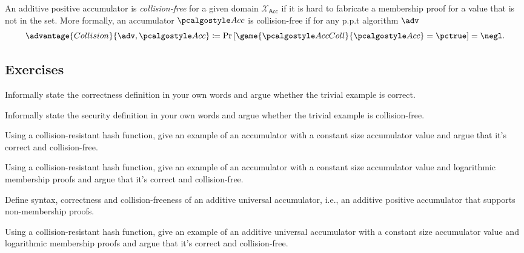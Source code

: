\begin{definition}
    An additive positive accumulator is \emph{collision-free} for a given domain $\mathcal{X}_\mathsf{Acc}$ if it is hard to fabricate a membership proof for a value that is not in the set.
    More formally, an accumulator $\algo{Acc}$ is collision-free if for any p.p.t algorithm $\adv$
    \[
      \advantage{Collision}{\adv, \algo{Acc}} \defeq \pr{\game{\algo{AccColl}}{\algo{Acc}} = \pctrue} = \negl.
    \]
\end{definition}

\subsection{Exercises}

\begin{exercise}
  Informally state the correctness definition in your own words and argue whether the trivial example is correct.
\end{exercise}

\begin{exercise}
  Informally state the security definition in your own words and argue whether the trivial example is collision-free.
\end{exercise}

\begin{exercise}
  Using a collision-resistant hash function, give an example of an accumulator with a constant size accumulator value and argue that it's correct and collision-free.
\end{exercise}

\begin{exercise}[Optional]
  Using a collision-resistant hash function, give an example of an accumulator with a constant size accumulator value and logarithmic membership proofs and argue that it's correct and collision-free.
\end{exercise}

\begin{exercise}
  Define syntax, correctness and collision-freeness of an additive universal accumulator, i.e., an additive positive accumulator that supports non-membership proofs.
\end{exercise}

\begin{exercise}[Optional]
  Using a collision-resistant hash function, give an example of an additive universal accumulator with a constant size accumulator value and logarithmic membership proofs and argue that it's correct and collision-free.
\end{exercise}


